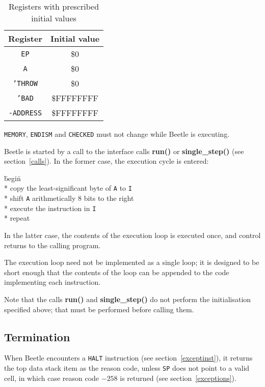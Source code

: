 \documentclass{article}
\begin{document}
\begin{table}[htbp]
\begin{center}
\begin{tabular}{cc} \toprule
\bf Register & \bf Initial value \\ \midrule
{\tt EP} & \$0 \\
{\tt A} & \$0 \\
{\tt 'THROW} & \$0 \\
{\tt 'BAD} & {\$FFFFFFFF} \\
{\tt -ADDRESS} & {\$FFFFFFFF} \\ \bottomrule
\end{tabular}
\caption{\label{inittable}Registers with prescribed initial values}
\end{center}
\end{table}

{\tt MEMORY}, {\tt ENDISM} and {\tt CHECKED} must not change while Beetle is executing.

Beetle is started by a call to the interface calls {\bf run()} or {\bf
single\_step()} (see section~\ref{calls}). In the former case, the execution
cycle is entered:

\begin{tabbing}
\hspace{0.5in}\=begin\=\+\+ \\*
copy the least-significant byte of {\tt A} to {\tt I} \\*
shift {\tt A} arithmetically 8 bits to the right \\*
execute the instruction in {\tt I} \- \\*
repeat
\end{tabbing}

In the latter case, the contents of the execution loop is executed once, and
control returns to the calling program.

The execution loop need not be implemented as a single loop; it  is designed to
be short enough that the contents of the loop can be appended  to the code
implementing each instruction.

Note that the calls {\bf run()} and {\bf single\_step()} do not perform the
initialisation specified above; that must be performed before calling them.


\subsection{Termination}

When Beetle encounters a {\tt HALT} instruction (see section~\ref{exceptinst}),
it returns the top data stack item as the reason code, unless {\tt SP} does not
point to a valid cell, in which case reason code $-258$ is returned (see section~\ref{exceptions}).
\end{document}
